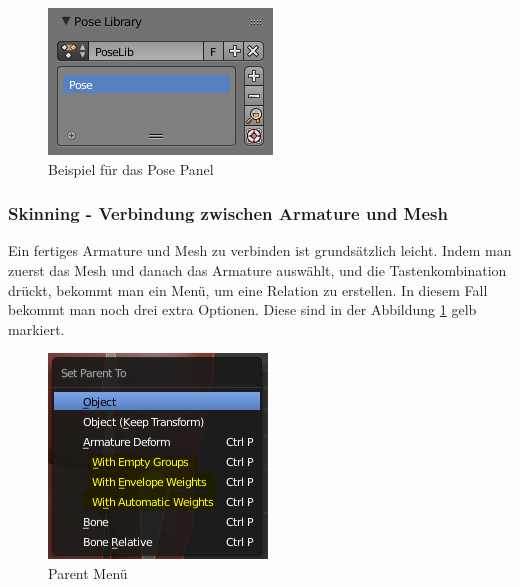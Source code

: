 \begin{figure}[H]
    \centering

    \includegraphics[width=.8\textwidth]{images/rigging_pose_panel.png}
    \caption{Beispiel für das Pose Panel}
\end{figure}

\subsubsection{Skinning - Verbindung zwischen Armature und Mesh}
Ein fertiges Armature und Mesh zu verbinden ist grundsätzlich leicht. Indem man zuerst das Mesh und danach das Armature auswählt, und die Tastenkombination  drückt,
bekommt man ein Menü, um eine Relation zu erstellen. In diesem Fall bekommt man noch drei extra Optionen. Diese sind in der Abbildung \ref{rigging:parentmenu} gelb markiert.

\begin{figure}[H]
    \centering

    \includegraphics[width=.8\textwidth]{images/rigging_connecting_arm_and_mesh.PNG}
    \caption{Parent Menü}
    \label{rigging:parentmenu}
\end{figure}

